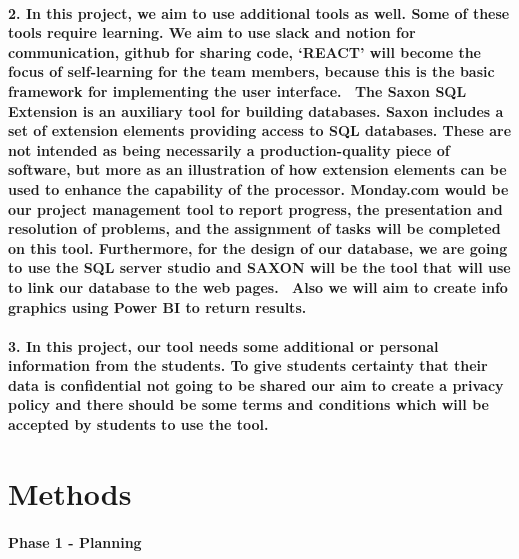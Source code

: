 \documentclass[12pt]{article}
\begin{document}
\paragraph	{2. In this project, we aim to use additional tools as well. Some of these tools require learning. We aim to use slack and notion for communication, github for sharing code, ‘REACT’ will become the focus of self-learning for the team members, because this is the basic framework for implementing the user interface.~\cite{Spittel2020} 
The Saxon SQL Extension is an auxiliary tool for building databases. Saxon includes a set of extension elements providing access to SQL databases. These are not intended as being necessarily a production-quality piece of software, but more as an illustration of how extension elements can be used to enhance the capability of the processor. Monday.com would be our project management tool to report  progress, the presentation and resolution of problems, and the assignment of tasks will be completed on this tool. Furthermore, for the design of our database, we are going to use the SQL server studio and SAXON will be the tool that will use to link our database to the web pages.~\cite{Kay2020} Also we will aim to create info graphics using Power BI to return results.}

\paragraph{3.	In this project, our tool needs some additional or personal information from the students. To give students certainty that their data is confidential not going to be shared our aim to create a privacy policy and there should be some terms and conditions which will be accepted by students to use the tool. }

\newpage

\section{Methods} %


\paragraph{Phase 1 - Planning}
\end{document}
